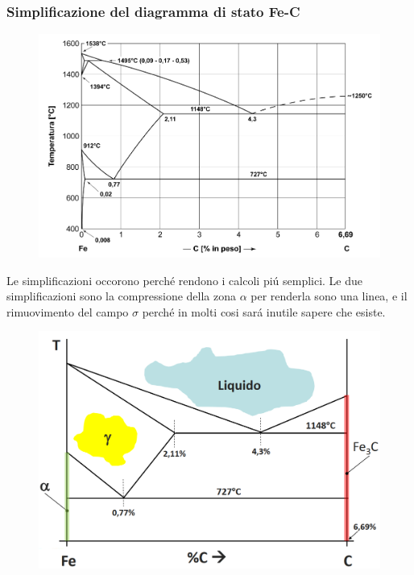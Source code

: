 \documentclass{article}
\begin{document}
{            \subsubsection{Simplificazione del diagramma di stato Fe-C}
                \begin{figure}[h!]
                    \centering
                    \includegraphics[width=.85\linewidth]{L12 - Diagramma Fe-C non simplificato.png}
                \end{figure}
                Le simplificazioni occorono perch\'e rendono i calcoli pi\'u semplici. Le due simplificazioni sono la compressione della zona $\alpha$ per renderla sono una linea, e il rimuovimento del campo $\sigma$ perch\'e in molti cosi sar\'a inutile sapere che esiste. 
                \begin{figure}[h!]
                    \centering
                    \includegraphics[width=.85\linewidth]{L12 - Diagramma Fe-C simplificato.png}
                \end{figure}
            \newpage
}
\end{document}
